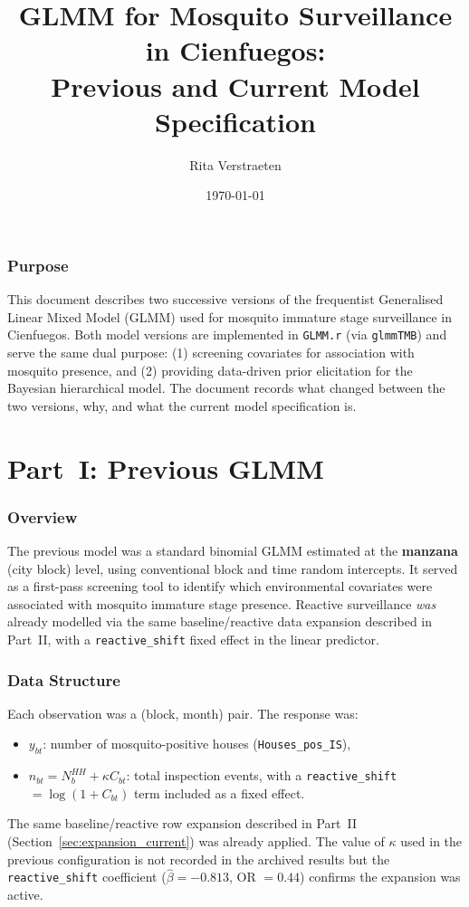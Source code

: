 \documentclass[12pt,a4paper]{article}
\title{GLMM for Mosquito Surveillance in Cienfuegos:\\
       Previous and Current Model Specification}
\author{Rita Verstraeten}
\date{\today}
\begin{document}
\maketitle
\tableofcontents
\newpage

\section{Purpose}

This document describes two successive versions of the frequentist Generalised Linear Mixed Model (GLMM) used for mosquito immature stage surveillance in Cienfuegos. Both model versions are implemented in \texttt{GLMM.r} (via \texttt{glmmTMB}) and serve the same dual purpose: (1) screening covariates for association with mosquito presence, and (2) providing data-driven prior elicitation for the Bayesian hierarchical model. The document records what changed between the two versions, why, and what the current model specification is.

\part*{Part~I: Previous GLMM}

\section{Overview}

The previous model was a standard binomial GLMM estimated at the \textbf{manzana} (city block) level, using conventional block and time random intercepts. It served as a first-pass screening tool to identify which environmental covariates were associated with mosquito immature stage presence. Reactive surveillance \emph{was} already modelled via the same baseline/reactive data expansion described in Part~II, with a \texttt{reactive\_shift} fixed effect in the linear predictor.

\section{Data Structure}

Each observation was a (block, month) pair. The response was:
\begin{itemize}
  \item $y_{bt}$: number of mosquito-positive houses (\texttt{Houses\_pos\_IS}),
  \item $n_{bt} = N_b^{HH} + \kappa C_{bt}$: total inspection events, with a \texttt{reactive\_shift} $= \log(1 + C_{bt})$ term included as a fixed effect.
\end{itemize}
The same baseline/reactive row expansion described in Part~II (Section~\ref{sec:expansion_current}) was already applied. The value of $\kappa$ used in the previous configuration is not recorded in the archived results but the \texttt{reactive\_shift} coefficient ($\hat{\beta} = -0.813$, OR $= 0.44$) confirms the expansion was active.
\end{document}
